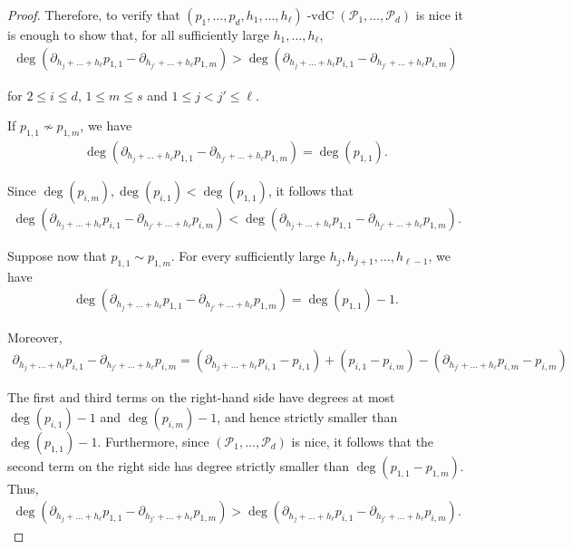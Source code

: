 \documentclass[11pt,reqno]{amsart}
\newcommand{\cP}{{\mathcal P}}
\DeclareMathOperator{\vdc}{-vdC}
\theoremstyle{definition}
\theoremstyle{remark}
\begin{document}
\begin{proof}
Therefore, to verify that $(p_1,\ldots,p_d,h_1,\dots,h_\ell)\vdc(\cP_1,\ldots, \cP_d)$ is nice it is enough to show that, for all sufficiently large $h_{1},\dots,h_{\ell}$, \begin{align*}
    \deg(\partial_{h_j+\dots+h_\ell} p_{1,1} - \partial_{h_{j'}+\dots+h_\ell} p_{1,m}) > \deg(\partial_{h_j+\dots+h_\ell} p_{i,1} - \partial_{h_{j'}+\dots+h_\ell} p_{i,m})
\end{align*}

for $2\leq i \leq d$, $1\leq m\leq s$ and $1\leq j<j'\leq \ell$. 

If $p_{1,1}\not\sim p_{1,m}$, we have \begin{align*}
            \deg(\partial_{h_j+\dots+h_{\ell}} p_{1,1} - \partial_{h_{j'}+\dots+h_{\ell}}p_{1,m}) = \deg(p_{1,1}).
        \end{align*}

        Since $\deg(p_{i,m}),\deg(p_{i,1})<\deg(p_{1,1})$, it follows that\begin{align*}
            \deg(\partial_{h_j+\dots+h_{\ell}} p_{i,1} - \partial_{h_{j'}+\dots+h_{\ell}}p_{i,m}) < \deg(\partial_{h_j+\dots+h_{\ell}} p_{1,1} - \partial_{h_{j'}+\dots+h_{\ell}}p_{1,m}).
        \end{align*}
        
        Suppose now that $p_{1,1}\sim p_{1,m}$. For every sufficiently large $h_j,h_{j+1},\dots,h_{\ell-1}$, we have \begin{align*}
            \deg(\partial_{h_j+\dots+h_{\ell}}p_{1,1} - \partial_{h_{j'}+\dots+h_{\ell}}p_{1,m}) = \deg(p_{1,1})-1. 
        \end{align*}

        Moreover,\begin{align*}
            \partial_{h_j+\dots+h_{\ell}} p_{i,1} - \partial_{h_{j'}+\dots+h_{\ell}}p_{i,m} =(\partial_{h_j+\dots+h_{\ell}} p_{i,1} -p_{i,1})+(p_{i,1}-p_{i,m}) - (\partial_{h_{j'}+\dots+h_{\ell}}p_{i,m} - p_{i,m})
        \end{align*}

        The first and third terms on the right-hand side have degrees at most $\deg(p_{i,1})-1$ and $\deg(p_{i,m})-1$, and hence strictly smaller than $\deg(p_{1,1})-1$. Furthermore, since $(\cP_1,\dots,\cP_d)$ is nice, it follows that the second term on the right side has degree strictly smaller than $\deg(p_{1,1}-p_{1,m})$. Thus,\begin{align*}
    \deg(\partial_{h_j+\dots+h_\ell} p_{1,1} - \partial_{h_{j'}+\dots+h_\ell} p_{1,m}) > \deg(\partial_{h_j+\dots+h_\ell} p_{i,1} - \partial_{h_{j'}+\dots+h_\ell} p_{i,m}).
\end{align*}


\end{proof}
\end{document}
